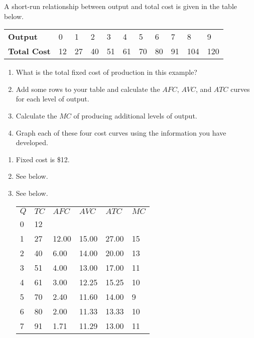 \begin{enumialphparenastyle}
\begin{ex}\label{ex:ch8ex4}
A short-run relationship between output and total cost is given in the table below.
\begin{center}
\begin{tabu} to \linewidth {|X[2.5,c]X[1,c]X[1,c]X[1,c]X[1,c]X[1,c]X[1,c]X[1,c]X[1,c]X[1,c]X[1,c]|}	\hline
{}	\textbf{Output}		&	0	&	1	&	2	&	3	&	4	&	5	&	6	&	7	&	8	&	9	\\
						\textbf{Total Cost}	&	12	&	27	&	40	&	51	&	61	&	70	&	80	&	91	&	104	&	120	\\	\hline
\end{tabu}
\end{center}
\begin{enumerate}
	\item	What is the total fixed cost of production in this example?
	\item	Add some rows to your table and calculate the $AFC$, $AVC$, and $ATC$ curves for each level of output.
	\item	Calculate the $MC$ of producing additional levels of output.
	\item	Graph each of these four cost curves using the information you have developed.
\end{enumerate}
\begin{sol}
\begin{enumerate}
	\item	Fixed cost is \$12.
	\item	See below.
	\item	See below.
	\begin{center}
	\begin{tabu} to \linewidth {|X[1,c]X[1,c]X[1,c]X[1,c]X[1,c]X[1,c]|}	\hline
		\textbf{$Q$} & \textbf{$TC$} & \textbf{$AFC$} & \textbf{$AVC$} & \textbf{$ATC$} & \textbf{$MC$}	\\
		0	&	12	&		&		&		&		\\
		1	&	27	&	12.00	&	15.00	&	27.00	&	15	\\
		2	&	40	&	6.00	&	14.00	&	20.00	&	13	\\
		3	&	51	&	4.00	&	13.00	&	17.00	&	11	\\
		4	&	61	&	3.00	&	12.25	&	15.25	&	10	\\
		5	&	70	&	2.40	&	11.60	&	14.00	&	9	\\
		6	&	80	&	2.00	&	11.33	&	13.33	&	10	\\
		7	&	91	&	1.71	&	11.29	&	13.00	&	11	\\

\end{tabu}
\end{center}
\end{enumerate}
\end{sol}
\end{ex}
\end{enumialphparenastyle}

